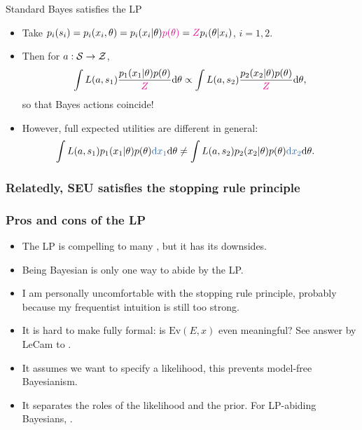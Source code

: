 \documentclass[10pt]{beamer}
\begin{document}
\begin{frame}{Standard Bayes satisfies the LP}
\begin{itemize}
  \item Take $p_i(s_i) = p_i(x_i,\theta) = p_i(x_i\vert\theta)\textcolor{magenta}{p(\theta)} = \textcolor{magenta}{Z} p_i(\theta\vert x_i)$, $i=1,2$.
  \vfill
  \item Then for $a:\mathcal{S}\rightarrow\mathcal{Z}$,
  $$ \int L(a,s_1) \frac{p_1(x_1\vert\theta)p(\theta)}{\textcolor{magenta}{Z}} {\rm d}\theta \propto \int L(a,s_2) \frac{p_2(x_2\vert\theta)p(\theta)}{\textcolor{magenta}{Z}} {\rm d}\theta, $$
  so that Bayes actions coincide!
  \vfill
  \item However, full expected utilities are different in general:
  \begin{align*}
    \int L(a,s_1) p_1(x_1\vert\theta)p(\theta) \unn{\d x_1}\d\theta
    &\neq \int L(a,s_2) p_2(x_2\vert\theta)p(\theta) \unn{\d x_2}\d\theta.
  \end{align*}
\end{itemize}
\end{frame}

\begin{frame}
  \frametitle{Relatedly, SEU satisfies the stopping rule principle}
\end{frame}

\begin{frame}
\frametitle{Pros and cons of the LP}
\begin{itemize}
  \item The LP is compelling to many \citep{BeWo88}, but it has its downsides.
  \item Being Bayesian is only one way to abide by the LP.
  \item I am personally uncomfortable with the stopping rule principle, probably because my frequentist intuition is still too strong.
  \item It is hard to make fully formal: is $\text{Ev}(E,x)$ even meaningful? See answer by LeCam to \citep{BeWo88}.
  \item It assumes we want to specify a likelihood, this prevents model-free Bayesianism.
  \item It separates the roles of the likelihood and the prior. For LP-abiding Bayesians, .
\end{itemize}
\end{frame}

\end{document}
